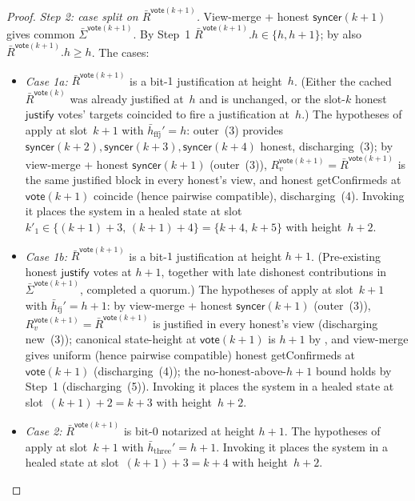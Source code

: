 \documentclass{article}
\newcommand{\just}{\ensuremath{\mathsf{justify}}\xspace}
\newcommand{\syncer}{\mathsf{syncer}}
\newcommand{\vote}{\mathsf{vote}}
\newcommand{\comm}[1]{\bar{#1}}
\newcommand{\getConfirmed}{\textsf{getConfirmed}\xspace}
\theoremstyle{plain}
\theoremstyle{definition}
\theoremstyle{remark}
\begin{document}
\begin{proof}
\emph{Step 2: case split on $\comm{R}^{\vote(k+1)}$.}
View-merge + honest $\syncer(k+1)$ gives common $\comm{\Sigma}^{\vote(k+1)}$. By Step~1 $\comm{R}^{\vote(k+1)}.h \in \{h, h+1\}$; by  also $\comm{R}^{\vote(k+1)}.h \geq h$. The cases:
\begin{itemize}
  \item \emph{Case 1a:} $\comm{R}^{\vote(k+1)}$ is a bit-$1$ justification at height~$h$. (Either the cached $\comm{R}^{\vote(k)}$ was already justified at~$h$ and is unchanged, or the slot-$k$ honest \just votes' targets coincided to fire a justification at~$h$.) The hypotheses of  apply at slot~$k+1$ with $\comm{h}_{\text{ffj}}' = h$: outer~(3) provides $\syncer(k+2), \syncer(k+3), \syncer(k+4)$ honest, discharging~(3); by view-merge + honest $\syncer(k+1)$ (outer~(3)), $R_v^{\vote(k+1)} = \comm{R}^{\vote(k+1)}$ is the same justified block in every honest's view, and honest \getConfirmed{}s at $\vote(k+1)$ coincide (hence pairwise compatible), discharging~(4). Invoking it places the system in a healed state at slot~$k'_1 \in \{(k+1)+3,\, (k+1)+4\} = \{k+4,\, k+5\}$ with height~$h+2$.
  \item \emph{Case 1b:} $\comm{R}^{\vote(k+1)}$ is a bit-$1$ justification at height $h+1$. (Pre-existing honest \just votes at $h+1$, together with late dishonest contributions in $\comm{\Sigma}^{\vote(k+1)}$, completed a quorum.) The hypotheses of  apply at slot~$k+1$ with $\comm{h}_{\text{fj}}' = h+1$: by view-merge + honest $\syncer(k+1)$ (outer~(3)), $R_v^{\vote(k+1)} = \comm{R}^{\vote(k+1)}$ is justified in every honest's view (discharging new~(3)); canonical state-height at $\vote(k+1)$ is $h+1$ by , and view-merge gives uniform (hence pairwise compatible) honest \getConfirmed{}s at $\vote(k+1)$ (discharging~(4)); the no-honest-above-$h+1$ bound holds by Step~1 (discharging~(5)). Invoking it places the system in a healed state at slot~$(k+1)+2 = k+3$ with height~$h+2$.
  \item \emph{Case 2:} $\comm{R}^{\vote(k+1)}$ is bit-$0$ notarized at height $h+1$. The hypotheses of  apply at slot~$k+1$ with $\comm{h}_{\text{three}}' = h+1$. Invoking it places the system in a healed state at slot~$(k+1)+3 = k+4$ with height~$h+2$.

\end{itemize}
\end{proof}
\end{document}
